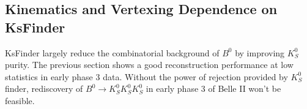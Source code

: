 \subsection{Kinematics and Vertexing Dependence on KsFinder} 

KsFinder largely reduce the combinatorial background of $B^0$ by improving $K_S^0$ purity. The previous section shows a good reconstruction performance at low statistics in early phase 3 data. Without the power of rejection provided by $K_S^0$ finder, rediscovery of $B^0 \to K_S^0  K_S^0  K_S^0$ in early phase 3 of Belle II won't be feasible. 

